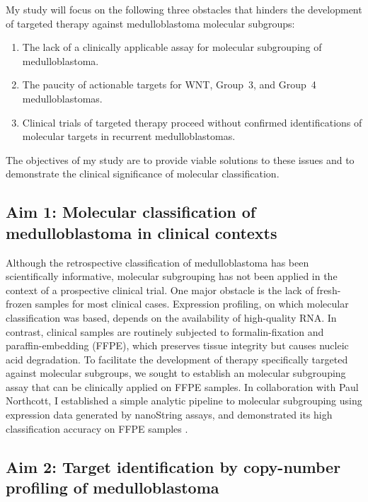 \documentclass[11pt,letterpaper]{article}
\theoremstyle{definition}
\begin{document}
My study will focus on the following three obstacles that hinders the development of targeted therapy against medulloblastoma molecular subgroups:

\begin{enumerate}
	\item The lack of a clinically applicable assay for molecular subgrouping of medulloblastoma.
	\item The paucity of actionable targets for WNT, Group~3, and Group~4 medulloblastomas.
	\item Clinical trials of targeted therapy proceed without confirmed identifications of molecular targets in recurrent medulloblastomas.
\end{enumerate}

The objectives of my study are to provide viable solutions to these issues and to demonstrate the clinical significance of molecular classification.

\subsection{Aim 1: Molecular classification of medulloblastoma in clinical contexts}

Although the retrospective classification of medulloblastoma has been scientifically informative, molecular subgrouping has not been applied in the context of a prospective clinical trial. One major obstacle is the lack of fresh-frozen samples for most clinical cases. Expression profiling, on which molecular classification was based, depends on the availability of high-quality RNA. In contrast, clinical samples are routinely subjected to formalin-fixation and paraffin-embedding (FFPE), which preserves tissue integrity but causes nucleic acid degradation. To facilitate the development of therapy specifically targeted against molecular subgroups, we sought to establish an molecular subgrouping assay that can be clinically applied on FFPE samples. In collaboration with Paul Northcott, I established a simple analytic pipeline to molecular subgrouping using expression data generated by nanoString assays, and demonstrated its high classification accuracy on FFPE samples .

\subsection{Aim 2: Target identification by copy-number profiling of medulloblastoma}
\end{document}
